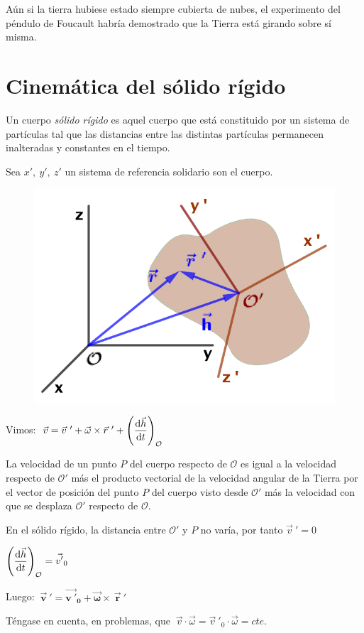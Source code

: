 \begin{miparrafo}
Aún si la tierra hubiese estado siempre cubierta de nubes, el experimento del péndulo de Foucault habría demostrado que la Tierra está girando sobre sí misma.	
\end{miparrafo}



\section{Cinemática del sólido rígido}

Un cuerpo \emph{sólido rígido} es aquel cuerpo que está constituido por un sistema de partículas tal que las distancias entre las distintas partículas permanecen inalteradas y constantes en el tiempo.

Sea $x', \ y',\ z'$ un sistema de referencia solidario son el cuerpo. 
\begin{figure}[H]
	\centering
	\includegraphics[width=.5\textwidth]{imagenes/imagenes11/T11IM14.png}
\end{figure}

Vimos: $\ \vec v=\vec v\ '+\vec \omega \times \vec r\ '+ \displaystyle \left( \dv{\vec h}{t} \right)_{\mathcal O}$

La velocidad de un punto $P$ del cuerpo respecto de $\mathcal {O}$ es igual a la velocidad respecto de $\mathcal {O'}$ más el producto vectorial de la velocidad angular de la Tierra por el vector de posición del punto $P$ del cuerpo visto desde $\mathcal{O'}$ más la velocidad con que se desplaza $\mathcal{O'}$ respecto de $\mathcal{O}$.

En el sólido rígido, la distancia entre $\mathcal {O'}$ y $P$ no varía, por tanto $\vec v\ '=0$

$\displaystyle \left( \dv{\vec h}{t} \right)_{\mathcal O}=\vec {v'}_0$

Luego: $\ \boldsymbol{ \vec v\ '=\vec {v\ '}_0+\vec \omega \times \	\vec r\ ' }$

\textcolor{gris}{Téngase en cuenta, en problemas, que $\ \vec v\cdot \vec \omega = \vec v\ '_0 \cdot \vec \omega = cte $.}

